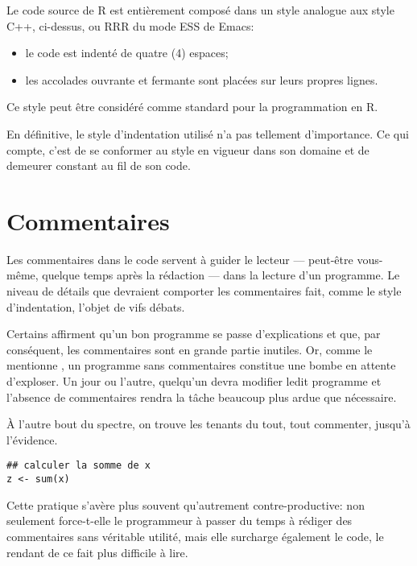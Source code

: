 Le code source de R est entièrement composé dans un style analogue aux
style C++, ci-dessus, ou RRR du mode ESS de Emacs:
\begin{itemize}
\item le code est indenté de quatre (4) espaces;
\item les accolades ouvrante et fermante sont placées sur leurs
  propres lignes.
\end{itemize}
Ce style peut être  considéré comme standard pour la programmation en
R.

En définitive, le style d'indentation utilisé n'a pas tellement
d'importance. Ce qui compte, c'est de se conformer au style en vigueur
dans son domaine et de demeurer constant au fil de son code.



\section{Commentaires}
\label{sec:collaboration:commentaires}

Les commentaires dans le code servent à guider le lecteur ---
peut-être vous-même, quelque temps après la rédaction --- dans la
lecture d'un programme. Le niveau de détails que devraient comporter
les commentaires fait, comme le style d'indentation, l'objet de vifs
débats.

Certains affirment qu'un bon programme se passe d'explications et que,
par conséquent, les commentaires sont en grande partie inutiles. Or,
comme le mentionne \citet{Oualline:C:1997}, un programme sans
commentaires constitue une bombe en attente d'exploser. Un jour ou
l'autre, quelqu'un devra modifier ledit programme et l'absence de
commentaires rendra la tâche beaucoup plus ardue que nécessaire.

À l'autre bout du spectre, on trouve les tenants du tout, tout
commenter, jusqu'à l'évidence.
\begin{Schunk}
\begin{Verbatim}
## calculer la somme de x
z <- sum(x)
\end{Verbatim}
\end{Schunk}
Cette pratique s'avère plus souvent qu'autrement contre-productive:
non seulement force-t-elle le programmeur à passer du temps à rédiger
des commentaires sans véritable utilité, mais elle surcharge également
le code, le rendant de ce fait plus difficile à lire.

